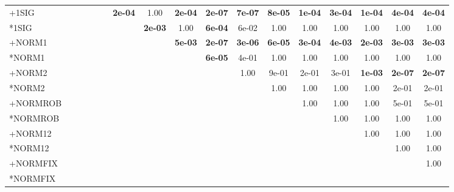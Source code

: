 \begin{table}[t]
{\begin{tabular}{lcccccccccccccccc}
+1SIG &  &  &  &  &  & \textbf{2e-04} & 1.00 & \textbf{2e-04} & \textbf{2e-07} & \textbf{7e-07} & \textbf{8e-05} & \textbf{1e-04} & \textbf{3e-04} & \textbf{1e-04} & \textbf{4e-04} & \textbf{4e-04} \\
*1SIG &  &  &  &  &  &  & \textbf{2e-03} & 1.00 & \textbf{6e-04} & 6e-02 & 1.00 & 1.00 & 1.00 & 1.00 & 1.00 & 1.00 \\
+NORM1 &  &  &  &  &  &  &  & \textbf{5e-03} & \textbf{2e-07} & \textbf{3e-06} & \textbf{6e-05} & \textbf{3e-04} & \textbf{4e-03} & \textbf{2e-03} & \textbf{3e-03} & \textbf{3e-03} \\
*NORM1 &  &  &  &  &  &  &  &  & \textbf{6e-05} & 4e-01 & 1.00 & 1.00 & 1.00 & 1.00 & 1.00 & 1.00 \\
+NORM2 &  &  &  &  &  &  &  &  &  & 1.00 & 9e-01 & 2e-01 & 3e-01 & \textbf{1e-03} & \textbf{2e-07} & \textbf{2e-07} \\
*NORM2 &  &  &  &  &  &  &  &  &  &  & 1.00 & 1.00 & 1.00 & 1.00 & 2e-01 & 2e-01 \\
+NORMROB &  &  &  &  &  &  &  &  &  &  &  & 1.00 & 1.00 & 1.00 & 5e-01 & 5e-01 \\
*NORMROB &  &  &  &  &  &  &  &  &  &  &  &  & 1.00 & 1.00 & 1.00 & 1.00 \\
+NORM12 &  &  &  &  &  &  &  &  &  &  &  &  &  & 1.00 & 1.00 & 1.00 \\
*NORM12 &  &  &  &  &  &  &  &  &  &  &  &  &  &  & 1.00 & 1.00 \\
+NORMFIX &  &  &  &  &  &  &  &  &  &  &  &  &  &  &  & 1.00 \\
*NORMFIX &  &  &  &  &  &  &  &  &  &  &  &  &  &  &  &  \\
\bottomrule
\end{tabular}
}
\end{table}

